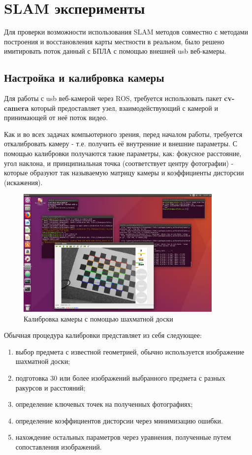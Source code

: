 \chapter{SLAM эксперименты}

Для проверки возможности использования SLAM методов совместно с методами построения и восстановления карты местности в реальном, было решено имитировать поток данный с БПЛА с помощью внешней usb веб-камеры.

\section{Настройка и калибровка камеры}

Для работы с usb веб-камерой через ROS, требуется использовать пакет \textbf{cv-camera} который предоставляет узел, взаимодействующий с камерой и принимающей от неё поток видео.

Как и во всех задачах компьютерного зрения, перед началом работы, требуется откалибровать камеру - т.е. получить её внутренние и внешние параметры. С помощью калибровки получаются такие параметры, как: фокусное расстояние, угол наклона, и принципиальная точка (соответствует центру фотографии) - которые образуют так называемую матрицу камеры и коэффициенты дисторсии (искажения).

\begin{figure}[h]
    \centering
    \includegraphics[width=0.9\textwidth]{images/chess.png}
    \caption{Калибровка камеры с помощью шахматной доски}
    \label{fig:chess}
\end{figure}

Обычная процедура калибровки представляет из себя следующее:

\begin{enumerate}
    \item выбор предмета с известной геометрией, обычно используется изображение шахматной доски;
    \item подготовка 30 или более изображений выбранного предмета с разных ракурсов и расстояний;
    \item определение ключевых точек на полученных фотографиях;
    \item определение коэффициентов дисторсии через минимизацию ошибки.
    \item нахождение остальных параметров через уравнения, полученные путем сопоставления изображений.
\end{enumerate}
 
